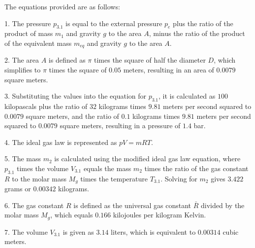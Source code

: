 The equations provided are as follows:

1. The pressure \( p_{3.1} \) is equal to the external pressure \( p_e \) plus the ratio of the product of mass \( m_1 \) and gravity \( g \) to the area \( A \), minus the ratio of the product of the equivalent mass \( m_{eq} \) and gravity \( g \) to the area \( A \).

2. The area \( A \) is defined as \( \pi \) times the square of half the diameter \( D \), which simplifies to \( \pi \) times the square of \( 0.05 \) meters, resulting in an area of \( 0.0079 \) square meters.

3. Substituting the values into the equation for \( p_{3.1} \), it is calculated as \( 100 \) kilopascals plus the ratio of \( 32 \) kilograms times \( 9.81 \) meters per second squared to \( 0.0079 \) square meters, and the ratio of \( 0.1 \) kilograms times \( 9.81 \) meters per second squared to \( 0.0079 \) square meters, resulting in a pressure of \( 1.4 \) bar.

4. The ideal gas law is represented as \( pV = mRT \).

5. The mass \( m_2 \) is calculated using the modified ideal gas law equation, where \( p_{3.1} \) times the volume \( V_{3.1} \) equals the mass \( m_2 \) times the ratio of the gas constant \( R \) to the molar mass \( M_g \) times the temperature \( T_{3.1} \). Solving for \( m_2 \) gives \( 3.422 \) grams or \( 0.00342 \) kilograms.

6. The gas constant \( R \) is defined as the universal gas constant \( \bar{R} \) divided by the molar mass \( M_g \), which equals \( 0.166 \) kilojoules per kilogram Kelvin.

7. The volume \( V_{3.1} \) is given as \( 3.14 \) liters, which is equivalent to \( 0.00314 \) cubic meters.